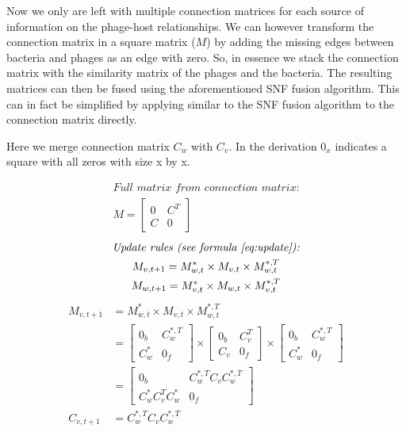 \documentclass{article}
\begin{document}
Now we only are left with multiple connection matrices for each source of 
information on the phage-host relationships. We can however transform the
connection matrix in a square matrix ($M$) by adding the missing edges between
bacteria and phages as an edge with zero. So, in essence we stack
the connection matrix with the similarity matrix of the phages and the bacteria.
The resulting matrices can then
be fused using the aforementioned SNF fusion algorithm. This can in fact
be simplified by applying similar to the SNF fusion algorithm to the connection matrix 
directly. 

Here we merge connection matrix $C_w$ with $C_v$. In the derivation $0_x$ indicates a square with all zeros with size x by x.

\begin{equation}
\begin{gathered}
    \textit{Full matrix from connection matrix:} \\
    M = \begin{bmatrix}
            0 & C^T \\
            C & 0
        \end{bmatrix} 
\end{gathered}
\end{equation}
\begin{equation}
\begin{gathered}
    \textit{Update rules (see formula~\ref{eq:update}):} \\
    M_{v, t+1} = M^*_{w, t} \times M_{v, t} \times M^{*,T}_{w, t} \\
    M_{w, t+1} = M^*_{v, t} \times M_{w, t} \times M^{*,T}_{v, t}
\end{gathered}
\end{equation}
\begin{equation}
\begin{aligned}
    M_{v, t+1} &= M^*_{w, t} \times M_{v, t} \times M^{*,T}_{w, t} \\
               &= \begin{bmatrix}
                   0_b & C^{*,T}_w \\
                   C^*_w & 0_f
               \end{bmatrix} \times 
               \begin{bmatrix}
                   0_b & C^T_v \\
                   C_v & 0_f
               \end{bmatrix} \times
               \begin{bmatrix} 
                   0_b & C^{*,T}_w \\
                   C^*_w & 0_f
               \end{bmatrix} \\
               &= \begin{bmatrix}
                   0_b & C^{*,T}_w C_v C^{*,T}_w \\
                   C^*_w C^T_v C^*_w & 0_f
                   \end{bmatrix} \\
     C_{v,t+1} &= C^{*,T}_w C_v C^{*,T}_w
\end{aligned}
\end{equation}
\end{document}
